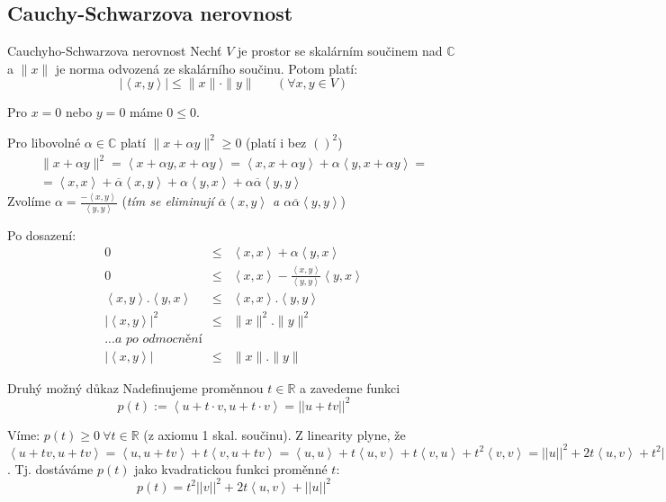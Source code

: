 \subsection{Cauchy-Schwarzova nerovnost}


\begin{vetaN}{Cauchyho-Schwarzova nerovnost}
Nechť $V$ je prostor se skalárním součinem nad $\mathbb{C}$ a $\|x\|$ je norma odvozená ze skalárního součinu. Potom platí:
$$\left|\left<x,y\right>\right| \le \|x\|\cdot\|y\| \;\;\;\;\;\; (\forall x,y \in V)$$

\begin{dukaz}
Pro $x=0$ nebo $y=0$ máme $0 \le 0$.

Pro libovolné $\alpha \in \mathbb{C}$ platí $\|x+\alpha y\|^2 \ge 0$ (platí i bez $( )^2$)
\begin{align*}
\|x+\alpha y\|^2 = \left<x+\alpha y, x+\alpha y\right> = \left<x, x+\alpha y\right> + \alpha \left<y, x+\alpha y\right> = \\
= \left<x,x\right> + \overline{\alpha}\left<x,y\right> + \alpha\left<y,x\right> + \alpha \overline{\alpha}\left<y,y\right>
\end{align*}
Zvolíme $\alpha = \frac{-\left<x,y\right>}{\left<y,y\right>}$ (\emph{tím se eliminují $\overline{\alpha}\left<x,y\right>$ a $\alpha \overline{\alpha}\left<y,y\right>$})

Po dosazení:
\begin{align*}
0 &\le& \left<x,x\right> + \alpha \left<y,x\right> \\
0 &\le& \left<x,x\right> - \frac{\left<x,y\right>}{\left<y,y\right>}\left<y,x\right> \\
\left<x,y\right>.\left<y,x\right> &\le& \left<x,x\right>.\left<y,y\right> \\
|\left<x,y\right>|^2 & \le & \|x\|^2 . \|y\|^2 \\
\textit{...a po odmocnění} \\
|\left<x,y\right>| & \le & \|x\|.\|y\|
\end{align*}

\end{dukaz}

\begin{obecne}{Druhý možný důkaz}
\noindent Nadefinujeme proměnnou $t\in\mathbb{R}$ a zavedeme funkci
$$p(t):=\left<u+t\cdot v,u+t\cdot v\right>=||u+tv||^2$$

\noindent
Víme: $p(t)\geq 0\ \forall t\in\mathbb{R}$ (z axiomu 1 skal. součinu). Z linearity plyne, že $\left<u+tv,u+tv\right>=\left<u,u+tv\right>+t\left<v,u+tv\right>=\left<u,u\right>+t\left<u,v\right>+t\left<v,u\right>+t^2\left<v,v\right>=||u||^2+2t\left<u,v\right>+t^2||v||^2$. Tj. dostáváme $p(t)$ jako kvadratickou funkci proměnné $t$:
$$p(t)=t^2||v||^2+2t\left<u,v\right>+||u||^2$$


\end{obecne}
\end{vetaN}
